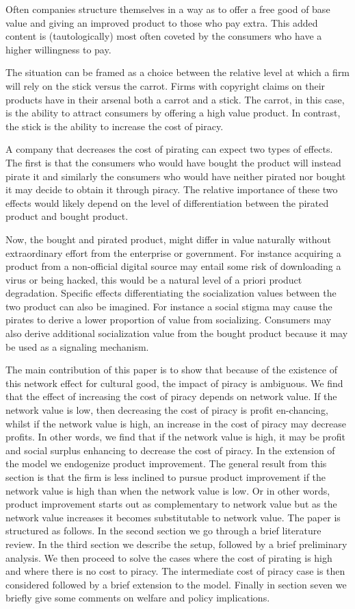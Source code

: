 \documentclass[11pt]{article}
\begin{document}
Often companies structure themselves in a way as to offer a free good of base value and giving an improved product to those who pay extra. This added content is (tautologically) most often coveted by the consumers who have a higher willingness to pay.

The situation can be framed as a choice between the relative level at which a firm will rely on the stick versus the carrot. Firms with copyright claims on their products have in their arsenal both a carrot and a stick. The carrot, in this case, is the ability to attract consumers by offering a high value product. In contrast, the stick is the ability to increase the cost of piracy.

A company that decreases the cost of pirating can expect two types of effects. The first is that the consumers who would have bought the product will instead pirate it and similarly the consumers who would have neither pirated nor bought it may decide to obtain it through piracy. The relative importance of these two effects would likely depend on the level of differentiation between the pirated product and bought product.

Now, the bought and pirated product, might differ in value naturally without extraordinary effort from the enterprise or government. For instance acquiring a product from a non-official digital source may entail some risk of downloading a virus or being hacked, this would be a natural level of a priori product degradation. Specific effects differentiating the socialization values between the two product can also be imagined. For instance a social stigma may cause the pirates to derive a lower proportion of value from socializing. Consumers may also derive additional socialization value from the bought product because it may be used as a signaling mechanism.

The main contribution of this paper is to show that because of the existence of this network effect for cultural good, the impact of piracy is ambiguous. We find that the effect of increasing the cost of piracy depends on network value. If the network value is low, then decreasing the cost of piracy is profit en-chancing, whilst if the network value is high, an increase in the cost of piracy may decrease profits. In other words, we find that if the network value is high, it may be profit and social surplus enhancing to decrease the cost of piracy. In the extension of the model we endogenize product improvement. The general result from this section is that the firm is less inclined to pursue product improvement if the network value is high than when the network value is low. Or in other words, product improvement starts out as complementary to network value but as the network value increases it becomes substitutable to network value.  The paper is structured as follows. In the second section we go through a brief literature review. In the third section we describe the setup, followed by a brief preliminary analysis. We then proceed to solve the cases where the cost of pirating is high and where there is no cost to piracy. The intermediate cost of piracy case is then considered followed by a brief extension to the model. Finally in section seven we briefly give some comments on welfare and policy implications.
\end{document}
